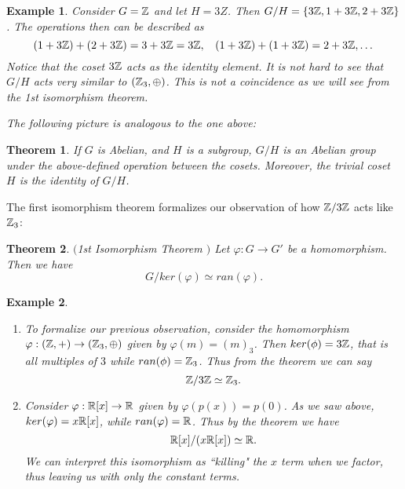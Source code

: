 \documentclass[12pt]{article}
\theoremstyle{plain}
\newtheorem{example}{Example}
\newtheorem{theorem}{Theorem}
\theoremstyle{definition}
\theoremstyle{remark}
\begin{document}
\begin{example}
Consider $G = \mathbb{Z}$ and let $H=3Z$. Then $G/H = \{3\mathbb{Z}, 1+3\mathbb{Z}, 2+3\mathbb{Z}\}$. The operations then can be described as
$$(1+3\mathbb{Z})+(2+3\mathbb{Z}) = 3+3\mathbb{Z} = 3\mathbb{Z}, \:\:\:\: (1+3\mathbb{Z})+(1+3\mathbb{Z}) = 2+3\mathbb{Z}, \dots$$
Notice that the coset $3\mathbb{Z}$ acts as the identity element. It is not hard to see that $G/H$ acts very similar to $(\mathbb{Z}_3, \oplus)$. This is not a coincidence as we will see from the 1st isomorphism theorem.

The following picture is analogous to the one above:

\bigskip



\end{example}
\begin{theorem}
If $G$ is Abelian, and $H$ is a subgroup, $G/H$ is an Abelian group under the above-defined operation between the cosets. Moreover, the trivial coset $H$ is the identity of $G/H$.
\end{theorem}
The first isomorphism theorem formalizes our observation of how $\mathbb{Z}/3\mathbb{Z}$ acts like $\mathbb{Z}_3$:
\begin{theorem}$($1st Isomorphism Theorem $)$
Let $\varphi: G\rightarrow G'$ be a homomorphism. Then we have
$$G/ker(\varphi) \simeq ran(\varphi).$$
\end{theorem}

\begin{example}
\begin{enumerate}
    \item To formalize our previous observation, consider the homomorphism $\varphi:(\mathbb{Z},+) \rightarrow (\mathbb{Z}_3, \oplus)$ given by $\varphi(m) = (m)_3$. Then $ker(\phi) = 3\mathbb{Z}$, that is all multiples of $3$ while $ran(\phi) = \mathbb{Z}_3$. Thus from the theorem we can say
    $$\mathbb{Z}/3\mathbb{Z} \simeq \mathbb{Z}_3.$$
    \item Consider $\varphi:\mathbb{R}[x]\rightarrow \mathbb{R}$ given by $\varphi(p(x)) = p(0)$. As we saw above, $ker(\varphi) = x\mathbb{R}[x]$, while $ran(\varphi)=\mathbb{R}$. Thus by the theorem we have
    $$\mathbb{R}[x]/(x\mathbb{R}[x]) \simeq \mathbb{R}.$$ We can interpret this isomorphism as ``killing" the $x$ term when we factor, thus leaving us with only the constant terms.
\end{enumerate}
\end{example}
\end{document}
